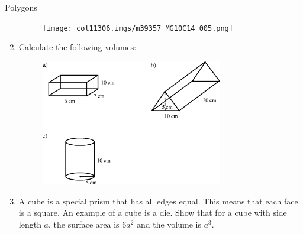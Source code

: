 \begin{exercises}{Polygons}
\begin{enumerate}[noitemsep, label=\textbf{\arabic*}. ]
    \setcounter{subfigure}{0}


	\begin{figure}[H] %
    \begin{center}
    \label{m39357*id63037!!!underscore!!!media}\label{m39357*id63037!!!underscore!!!printimage}\texttt{[image: col11306.imgs/m39357\_MG10C14\_005.png]} %
        
      \vspace{2pt}
    \vspace{.1in}
    
    \end{center}

 \end{figure}   

    \addtocounter{footnote}{-0}
            \label{m39357*uid18}\item Calculate the following volumes:

    \setcounter{subfigure}{0}


	\begin{figure}[H] %
    \begin{center}
    \label{m39357*id63058!!!underscore!!!media}\label{m39357*id63058!!!underscore!!!printimage}\includegraphics[width=300px]{col11306.imgs/m39357_MG10C14_006.png} %
        
      \vspace{2pt}
    \vspace{.1in}
    
    \end{center}

 \end{figure}   

    \addtocounter{footnote}{-0}
            \label{m39357*uid19}\item A cube is a special prism that has all edges equal. This means that each face is a square. An example of a cube is a die. Show that for a cube with side length $a$, the surface area is $6{a}^{2}$ and the volume is ${a}^{3}$.


\end{enumerate}
\end{exercises}
